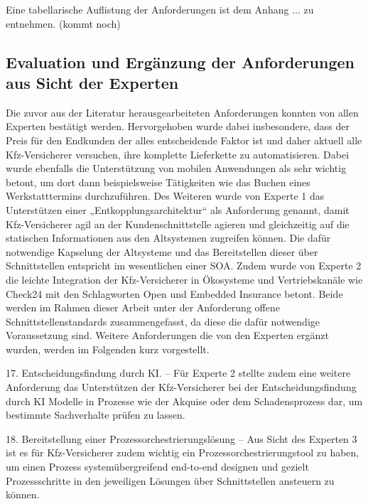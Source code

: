Eine tabellarische Auflistung der Anforderungen ist dem Anhang ... zu entnehmen. (kommt noch)











\subsection{Evaluation und Ergänzung der Anforderungen aus Sicht der Experten}

Die zuvor aus der Literatur herausgearbeiteten Anforderungen konnten von allen Experten bestätigt werden. Hervorgehoben wurde dabei insbesondere, dass der Preis für den Endkunden der alles entscheidende Faktor ist und daher aktuell alle Kfz-Versicherer versuchen, ihre komplette Lieferkette zu automatisieren. Dabei wurde ebenfalls die Unterstützung von mobilen Anwendungen als sehr wichtig betont, um dort dann beispielsweise Tätigkeiten wie das Buchen eines Werkstatttermins durchzuführen. Des Weiteren wurde von Experte 1 das Unterstützen einer „Entkopplungsarchitektur“ als Anforderung genannt, damit Kfz-Versicherer agil an der Kundenschnittstelle agieren und gleichzeitig auf die statischen Informationen aus den Altsystemen zugreifen können. Die dafür notwendige Kapselung der Altsysteme und das Bereitstellen dieser über Schnittstellen entspricht im wesentlichen einer SOA. Zudem wurde von Experte 2 die leichte Integration der Kfz-Versicherer in Ökosysteme und Vertriebskanäle wie Check24 mit den Schlagworten Open und Embedded Insurance betont. Beide werden im Rahmen dieser Arbeit unter der Anforderung offene Schnittstellenstandards zusammengefasst, da diese die dafür notwendige Voraussetzung sind. Weitere Anforderungen die von den Experten ergänzt wurden, werden im Folgenden kurz vorgestellt.

17. Entscheidungsfindung durch KI. – Für Experte 2 stellte zudem eine weitere Anforderung das Unterstützen der Kfz-Versicherer bei der Entscheidungsfindung durch KI Modelle in Prozesse wie der Akquise oder dem Schadensprozess dar, um bestimmte Sachverhalte prüfen zu lassen.

18. Bereitstellung einer Prozessorchestrierungslösung – Aus Sicht des Experten 3 ist es für Kfz-Versicherer zudem wichtig ein Prozessorchestrierungstool zu haben, um einen Prozess systemübergreifend end-to-end designen und gezielt Prozessschritte in den jeweiligen Lösungen über Schnittstellen ansteuern zu können.

